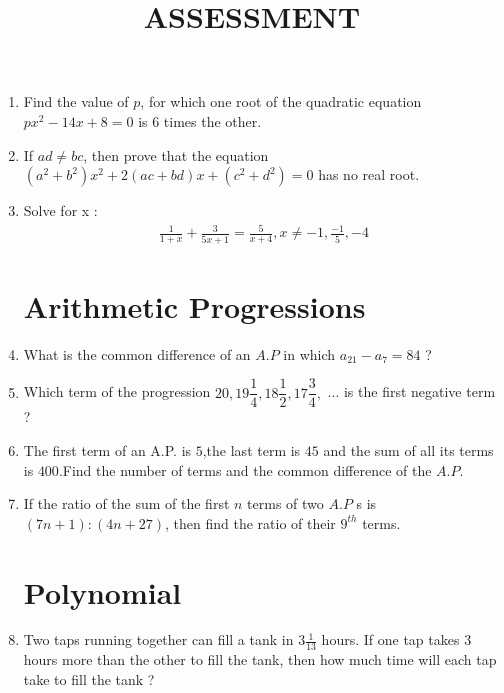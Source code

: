 \documentclass{article}
\title{ASSESSMENT}
\providecommand{\brak}[1]{\ensuremath{\left(#1\right)}}
\begin{document}
\maketitle
\begin{enumerate}

	\section{Quadratic Equations}
		\item Find the value of $p$, for which one root of the quadratic equation $px^{2} - 14x + 8 = 0$ is $6$ times the other.
  
		\item If $ad \neq bc$, then prove that the equation $\brak{a^2 + b^2}x^2 + 2\brak{ac +bd}x + \brak{c^2 + d^2} = 0 $ has no real root.

		\item Solve for x :
			\begin{align*}
				\frac{1}{1+x} + \frac{3}{5x+1} = \frac{5}{x+4} , 
				x \neq -1, \frac{-1}{5}, -4
				\end{align*}
												          
	\section{Arithmetic Progressions}
		\item What is the common difference of an $A.P$ in which $a_{21} - a_7 = 84$ ?

		\item Which term of the progression $20,19\dfrac{1}{4},18\dfrac{1}{2},17\dfrac{3}{4},$ ... is the first negative term ?

		\item The first term of an A.P. is $5$,the last term is $45$ and the sum of all its terms is $400$.Find the number of terms and the common difference of the $A.P$.

		\item If the ratio of the sum of the first $n$ terms of two $A.P$ s is $\brak{7n + 1} : \brak{4n + 27}$, then find the ratio of their $9^{th}$ terms.
																			        
	\section{Polynomial}
																			        		\item Two taps running together can fill a tank in $3\frac{1}{13}$ hours. If one tap takes $3$ hours more than the other to fill the tank, then how much time will each tap take to fill the tank ?

\end{enumerate}
\end{document}
